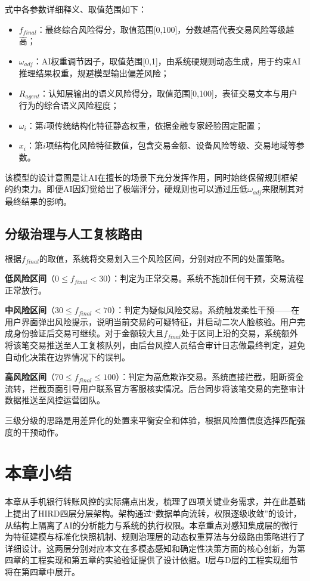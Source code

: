 \documentclass{xduugthesis}
\begin{document}
式中各参数详细释义、取值范围如下：

\begin{itemize}
    \item $f_{final}$：最终综合风险得分，取值范围[0,100]，分数越高代表交易风险等级越高；
    \item $\omega_{adj}$：AI权重调节因子，取值范围[0,1]，由系统硬规则动态生成，用于约束AI推理结果权重，规避模型输出偏差风险；
    \item $R_{agent}$：认知层输出的语义风险得分，取值范围[0,100]，表征交易文本与用户行为的综合语义风险程度；
    \item $\omega_i$：第$i$项传统结构化特征静态权重，依据金融专家经验固定配置；
    \item $x_i$：第$i$项结构化风险特征数值，包含交易金额、设备风险等级、交易地域等参数。
\end{itemize}

该模型的设计意图是让AI在擅长的场景下充分发挥作用，同时始终保留规则框架的约束力。即便AI因幻觉给出了极端评分，硬规则也可以通过压低$\omega_{adj}$来限制其对最终结果的影响。

\subsection{分级治理与人工复核路由}

根据$f_{final}$的取值，系统将交易划入三个风险区间，分别对应不同的处置策略。

\textbf{低风险区间}（$0 \le f_{final} < 30$）：判定为正常交易。系统不施加任何干预，交易流程正常放行。

\textbf{中风险区间}（$30 \le f_{final} < 70$）：判定为疑似风险交易。系统触发柔性干预——在用户界面弹出风险提示，说明当前交易的可疑特征，并启动二次人脸核验。用户完成身份验证后交易可继续。对于金额较大且$f_{final}$处于区间上沿的交易，系统额外将该笔交易推送至人工复核队列，由后台风控人员结合审计日志做最终判定，避免自动化决策在边界情况下的误判。

\textbf{高风险区间}（$70 \le f_{final} \le 100$）：判定为高危欺诈交易。系统直接拦截，阻断资金流转，拦截页面引导用户联系官方客服核实情况。后台同步将该笔交易的完整审计数据推送至风控运营团队。

三级分级的思路是用差异化的处置来平衡安全和体验，根据风险置信度选择匹配强度的干预动作。

\section{本章小结}

本章从手机银行转账风控的实际痛点出发，梳理了四项关键业务需求，并在此基础上提出了HIRD四层分层架构。架构通过“数据单向流转，权限逐级收敛”的设计，从结构上隔离了AI的分析能力与系统的执行权限。本章重点对感知集成层的微行为特征建模与标准化快照机制、规则治理层的动态权重算法与分级路由策略进行了详细设计。这两层分别对应本文在多模态感知和确定性决策方面的核心创新，为第四章的工程实现和第五章的实验验证提供了设计依据。I层与D层的工程实现细节将在第四章中展开。
\end{document}
